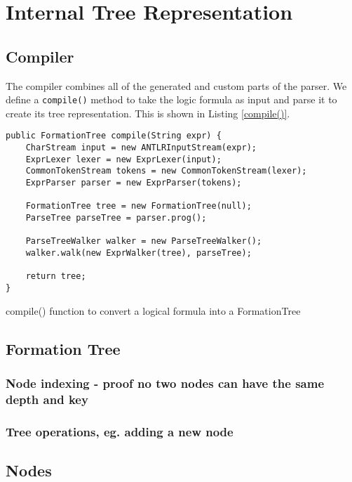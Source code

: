 \documentclass{report}
\begin{document}
\chapter{Internal Tree Representation}

\section{Compiler}
\label{sec:compiler}

The compiler combines all of the generated and custom parts of the parser. We define a {\tt compile()} method to take the logic formula as input and parse it to create its tree representation. This is shown in Listing \ref{compile()}.

\begin{listing}[ht]
\begin{verbatim}
public FormationTree compile(String expr) {
    CharStream input = new ANTLRInputStream(expr);
    ExprLexer lexer = new ExprLexer(input);
    CommonTokenStream tokens = new CommonTokenStream(lexer);
    ExprParser parser = new ExprParser(tokens);
    
    FormationTree tree = new FormationTree(null);
    ParseTree parseTree = parser.prog();
    
    ParseTreeWalker walker = new ParseTreeWalker();
    walker.walk(new ExprWalker(tree), parseTree);

    return tree;
}
\end{verbatim}
\caption{compile() function to convert a logical formula into a FormationTree}
\label{compile()}
\end{listing}

\section{Formation Tree}
\label{sec:formation_tree}

\subsection{Node indexing - proof no two nodes can have the same depth and key}
\subsection{Tree operations, eg. adding a new node}

\section{Nodes}
\end{document}
